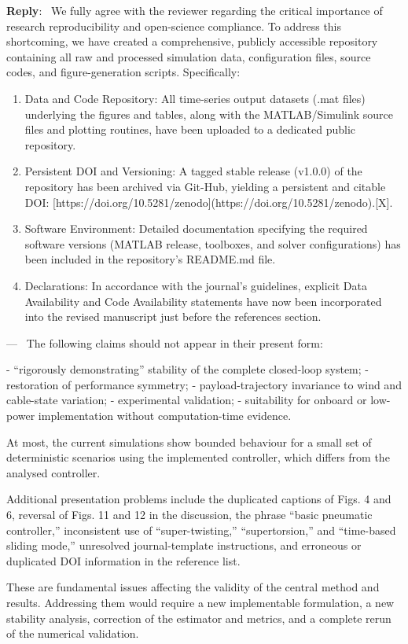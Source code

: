 \documentclass[11pt]{article}
\newcounter{reviewer}
\newcounter{point}[reviewer]
\renewcommand{\thepoint}{Comment\,\thereviewer.\arabic{point}}
\newenvironment{point}
   {\refstepcounter{point} \bigskip \noindent {\textbf{Reviewer~\thepoint} } ---\ }
   {\par }
\newenvironment{reply}
   {\medskip \noindent \color{blue} \begin{sf}\textbf{Reply}:\  }
   {\medskip \par \end{sf}}
\begin{document}
\begin{reply}
We fully agree with the reviewer regarding the critical importance of research reproducibility and open-science compliance.
To address this shortcoming, we have created a comprehensive, publicly accessible repository containing all raw and processed simulation data, configuration files, source codes, and figure-generation scripts. Specifically:
\begin{enumerate}
\item Data and Code Repository: All time-series output datasets (.mat files) underlying the figures and tables, along with the MATLAB/Simulink source files and plotting routines, have been uploaded to a dedicated public repository.
\item Persistent DOI and Versioning: A tagged stable release (v1.0.0) of the repository has been archived via Git-Hub, yielding a persistent and citable DOI: [https://doi.org/10.5281/zenodo](https://doi.org/10.5281/zenodo).[X].
\item Software Environment: Detailed documentation specifying the required software versions (MATLAB release, toolboxes, and solver configurations) has been included in the repository's README.md file.
\item Declarations: In accordance with the journal's guidelines, explicit Data Availability and Code Availability statements have now been incorporated into the revised manuscript just before the references section.
\end{enumerate}
\end{reply}

\begin{point}
The following claims should not appear in their present form:

- “rigorously demonstrating” stability of the complete closed-loop system;
- restoration of performance symmetry;
- payload-trajectory invariance to wind and cable-state variation;
- experimental validation;
- suitability for onboard or low-power implementation without computation-time evidence.

At most, the current simulations show bounded behaviour for a small set of deterministic scenarios using the implemented controller, which differs from the analysed controller.

Additional presentation problems include the duplicated captions of Figs. 4 and 6, reversal of Figs. 11 and 12 in the discussion, the phrase “basic pneumatic controller,” inconsistent use of “super-twisting,” “supertorsion,” and “time-based sliding mode,” unresolved journal-template instructions, and erroneous or duplicated DOI information in the reference list.

These are fundamental issues affecting the validity of the central method and results. Addressing them would require a new implementable formulation, a new stability analysis, correction of the estimator and metrics, and a complete rerun of the numerical validation.
\end{point}
\end{document}
